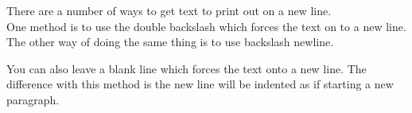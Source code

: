 \documentclass[11pt]{article}
\begin{document}
There are a number of ways to get text to print out on a new line.\\
One method is to use the double backslash which forces the text on to
a new line.\newline
The other way of doing the same thing is to use backslash newline.

You can also leave a blank line which forces the text onto a
new line. The difference with this method is the new line will be indented as if
starting a new paragraph.
\end{document}
